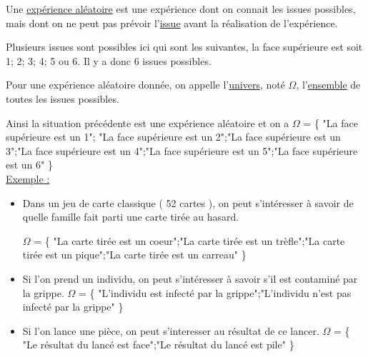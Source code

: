\documentclass[french]{book}
\begin{document}
\begin{defn}
Une \underline{expérience aléatoire} est une expérience dont on connait les issues possibles, mais dont on ne peut pas prévoir l'\underline{issue} avant la réalisation de l'expérience.
\end{defn}

Plusieurs issues sont possibles ici qui sont les suivantes, la face supérieure est soit
 1; 2; 3; 4; 5 ou 6. Il y a donc 6 issues possibles.

\begin{defn}
Pour une expérience aléatoire donnée, on appelle l'\underline{univers}, noté $\Omega$, l'\underline{ensemble} de toutes les issues possibles.
 \vspace{4mm}
\end{defn}

Ainsi la situation précédente est une expérience aléatoire et on a $\Omega$ = \{ "La face supérieure est un 1"; "La face supérieure est un 2";"La face supérieure est un 3";"La face supérieure est un 4";"La face supérieure est un 5";"La face supérieure est un 6" \}\\



\underline{Exemple :}
\begin{itemize}
\item Dans un jeu de carte classique ( 52 cartes ), on peut s'intéresser à savoir de quelle famille fait parti une carte tirée au hasard. 

$\Omega$ = \{ "La carte tirée est un coeur";"La carte tirée est un trèfle";"La carte tirée est un pique";"La carte tirée est un carreau"  \}\\
\item Si l'on prend un individu, on peut s'intéresser à savoir s'il est contaminé par la grippe. $\Omega$ = \{ "L'individu est infecté par la grippe";"L'individu n'est pas infecté par la grippe" \}\\
\item Si l'on lance une pièce, on peut s'interesser au résultat de ce lancer.
$\Omega$ = \{ "Le résultat du lancé est face";"Le résultat du lancé est pile" \}\\
\end{itemize}


\end{document}
